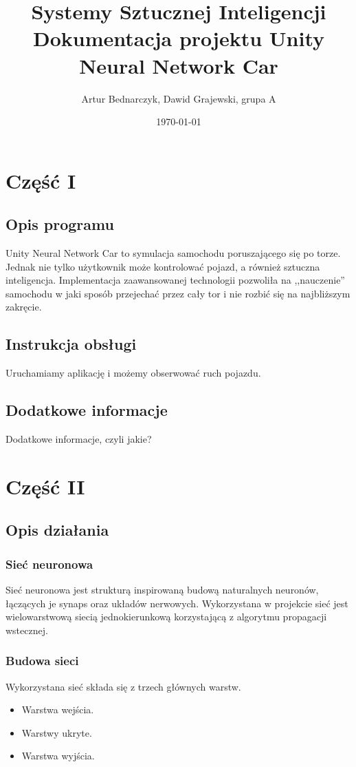 \documentclass[12pt,a4paper]{article}
\begin{document}
	
	\title{Systemy Sztucznej Inteligencji\\\small{Dokumentacja projektu Unity Neural Network Car}}
	\author{Artur Bednarczyk, Dawid Grajewski, grupa A}
	\date{\today}

	\maketitle
	\newpage
	\section*{Część I}
	\subsection*{Opis programu}
	Unity Neural Network Car to symulacja samochodu poruszającego się po torze. Jednak nie tylko użytkownik może kontrolować pojazd, a również sztuczna inteligencja. Implementacja zaawansowanej technologii pozwoliła na ,,nauczenie'' samochodu w jaki sposób przejechać przez cały tor i nie rozbić się na najbliższym zakręcie.
	\subsection*{Instrukcja obsługi}
	Uruchamiamy aplikację i możemy obserwować ruch pojazdu.
	\subsection*{Dodatkowe informacje}
	Dodatkowe informacje, czyli jakie?
	\newpage
	\section*{Część II}
	\subsection*{Opis działania} 
\subsubsection*{Sieć neuronowa}
Sieć neuronowa jest strukturą inspirowaną budową naturalnych neuronów, łączących je synaps oraz układów nerwowych. Wykorzystana w projekcie sieć jest wielowarstwową siecią jednokierunkową korzystającą z algorytmu propagacji wstecznej.
\subsubsection*{Budowa sieci}
Wykorzystana sieć składa się z trzech głównych warstw.
\begin{itemize}
	\item Warstwa wejścia.
	\item Warstwy ukryte.
	\item Warstwa wyjścia.
\end{itemize}
\end{document}
